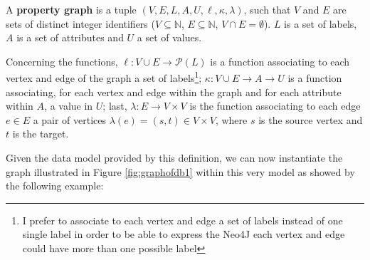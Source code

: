 \begin{definition}\label{def:propg10}
A \textbf{property graph} is a tuple $(V,E,L,A,U,\ell,\kappa,\lambda)$, such that $V$ and $E$ are sets of distinct integer identifiers ($V\subseteq \mathbb{N}$, $E\subseteq \mathbb{N}$, $V\cap E=\emptyset$). $L$ is a set of labels, $A$ is a set of attributes and $U$ a set of values.

Concerning the functions, $\ell\colon V\cup E\to \mathcal{P}(L)$ is a function associating to each vertex and edge of the graph a set of labels\footnote{I prefer to associate to each vertex and edge a set of labels instead of one single label in order to be able to express the Neo4J \cite{Neo4jMan,Neo4jAlg} each vertex and edge could have more than one possible label}; $\kappa\colon V\cup E\to A\to U$   is a function associating, for each vertex and edge within the graph and for each attribute within $A$, a value in $U$; last, $\lambda\colon E\to V\times V$ is the function associating to each edge $e\in E$ a pair of vertices $\lambda(e)=(s,t)\in V\times V$, where $s$ is the source vertex and $t$ is the target. 
\end{definition}

Given the data model provided by this definition, we can now instantiate 
the graph illustrated in Figure \ref{fig:graphofdb1} within this very model as showed by the following example:

